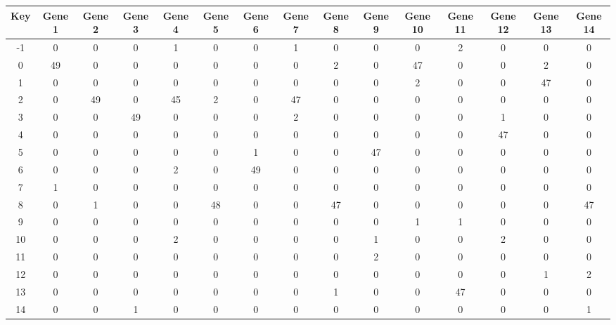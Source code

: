 \begin{tabular}{|c|c|c|c|c|c|c|c|c|c|c|c|c|c|c|}
\hline
Key & Gene 1 & Gene 2 & Gene 3 & Gene 4 & Gene 5 & Gene 6 & Gene 7 & Gene 8 & Gene 9 & Gene 10 & Gene 11 & Gene 12 & Gene 13 & Gene 14 \\
\hline
-1 & 0 & 0 & 0 & 1 & 0 & 0 & 1 & 0 & 0 & 0 & 2 & 0 & 0 & 0 \\
0 & 49 & 0 & 0 & 0 & 0 & 0 & 0 & 2 & 0 & 47 & 0 & 0 & 2 & 0 \\
1 & 0 & 0 & 0 & 0 & 0 & 0 & 0 & 0 & 0 & 2 & 0 & 0 & 47 & 0 \\
2 & 0 & 49 & 0 & 45 & 2 & 0 & 47 & 0 & 0 & 0 & 0 & 0 & 0 & 0 \\
3 & 0 & 0 & 49 & 0 & 0 & 0 & 2 & 0 & 0 & 0 & 0 & 1 & 0 & 0 \\
4 & 0 & 0 & 0 & 0 & 0 & 0 & 0 & 0 & 0 & 0 & 0 & 47 & 0 & 0 \\
5 & 0 & 0 & 0 & 0 & 0 & 1 & 0 & 0 & 47 & 0 & 0 & 0 & 0 & 0 \\
6 & 0 & 0 & 0 & 2 & 0 & 49 & 0 & 0 & 0 & 0 & 0 & 0 & 0 & 0 \\
7 & 1 & 0 & 0 & 0 & 0 & 0 & 0 & 0 & 0 & 0 & 0 & 0 & 0 & 0 \\
8 & 0 & 1 & 0 & 0 & 48 & 0 & 0 & 47 & 0 & 0 & 0 & 0 & 0 & 47 \\
9 & 0 & 0 & 0 & 0 & 0 & 0 & 0 & 0 & 0 & 1 & 1 & 0 & 0 & 0 \\
10 & 0 & 0 & 0 & 2 & 0 & 0 & 0 & 0 & 1 & 0 & 0 & 2 & 0 & 0 \\
11 & 0 & 0 & 0 & 0 & 0 & 0 & 0 & 0 & 2 & 0 & 0 & 0 & 0 & 0 \\
12 & 0 & 0 & 0 & 0 & 0 & 0 & 0 & 0 & 0 & 0 & 0 & 0 & 1 & 2 \\
13 & 0 & 0 & 0 & 0 & 0 & 0 & 0 & 1 & 0 & 0 & 47 & 0 & 0 & 0 \\
14 & 0 & 0 & 1 & 0 & 0 & 0 & 0 & 0 & 0 & 0 & 0 & 0 & 0 & 1 \\
\hline
\end{tabular}